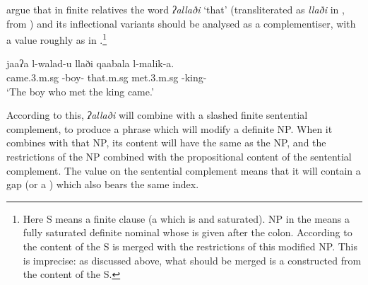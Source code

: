 \documentclass[output=paper
 	        ,biblatex
                ,babelshorthands
                ,newtxmath
                ,draftmode
                ,colorlinks, citecolor=brown
]{langscibook}
\begin{document}
\cite{Alqurashi:Borsley:12} argue that in  finite relatives the word 
\emph{ʔallaði} `that' (transliterated as \emph{llaði} in , from
\citealt[27]{Alqurashi:Borsley:12}) and its inflectional variants should be analysed as a
complementiser, with a  value roughly as in .\footnote{Here S  means a
  finite clause (a  which is \comps and  saturated).
  NP in the  means a fully saturated definite nominal whose
   is given after the colon. According to  the content of the
  S is merged
  with the restrictions of this modified NP. This is imprecise: as discussed above, what
  should be merged is a  constructed from the content of the S.}
\begin{exe}\ex\label{x:rc-57}
\gll jaaʔa l-walad-u   llaði qaabala l-malik-a.\\
     {came.3.{\sc m.sg}} {\DEF-boy-\NOM} {that.{\sc m.sg}} {met.3.{\sc m.sg}} {\DEF-king-\ACC}\\
\glt `The boy who met the king came.'
\end{exe}
\begin{exe}\ex\label{x:rc-58}
\end{exe}
According to this, \emph{ʔallaði} will combine with a slashed finite sentential
complement, to produce a phrase which will modify a definite NP.  When it combines with
that NP, its content will have the same  as the NP, and the restrictions of
the NP combined with the propositional content of the sentential complement. The
 value on the sentential complement means that it will contain a gap (or a
) which also bears the same index.
\end{document}
